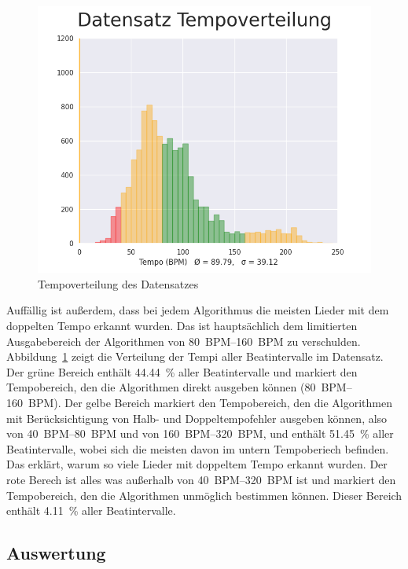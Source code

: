 {{		\begin{figure}[h]
			\centering
			\includegraphics[scale=0.45]{resources/dataset_tempo_histogram.png}
			\caption{Tempoverteilung des Datensatzes}
			\label{fig:dataset_tempo}
		\end{figure}

		Auffällig ist außerdem,
			dass bei jedem Algorithmus die meisten Lieder mit dem doppelten Tempo erkannt wurden.
		Das ist hauptsächlich dem limitierten Ausgabebereich der Algorithmen von \SIrange{80}{160}{BPM} zu verschulden.
		Abbildung~\ref{fig:dataset_tempo} zeigt die Verteilung der Tempi aller Beatintervalle im Datensatz.
		Der grüne Bereich enthält \SI{44.44}{\percent} aller Beatintervalle
			und markiert den Tempobereich,
			den die Algorithmen direkt ausgeben können (\SIrange{80}{160}{BPM}).
		Der gelbe Bereich markiert den Tempobereich,
			den die Algorithmen mit Berücksichtigung von Halb- und Doppeltempofehler ausgeben können,
			also von \SIrange{40}{80}{BPM} und von \SIrange{160}{320}{BPM},
			und enthält \SI{51.45}{\percent} aller Beatintervalle,
			wobei sich die meisten davon im untern Tempoberiech befinden.
		Das erklärt,
			warum so viele Lieder mit doppeltem Tempo erkannt wurden.
		Der rote Berech ist alles was außerhalb von \SIrange{40}{320}{BPM} ist
			und markiert den Tempobereich,
			den die Algorithmen unmöglich bestimmen können.
		Dieser Bereich enthält \SI{4.11}{\percent} aller Beatintervalle.
	}

	\subsection{Auswertung}
	{

}}
